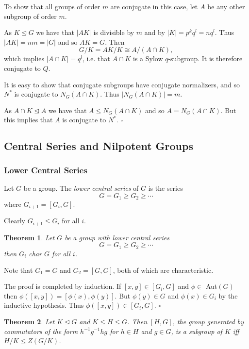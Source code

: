 \documentclass[10pt]{article}
\newtheorem{theorem}{Theorem}[section]
\newenvironment{proof}[1][Proof]{\begin{trivlist}
\item[\hskip \labelsep {\itshape #1}]}{\end{trivlist}}
\newenvironment{definition}[1][Definition]{\begin{trivlist}
\item[\hskip \labelsep {\bfseries #1}]}{\end{trivlist}}
\begin{document}
\begin{proof}
To show that all groups of order $m$ are conjugate in this case, let $A$ be any other subgroup of order $m$.

As $K \mathrel{\unlhd} G$ we have that $|AK|$ is divisible by $m$ and by $|K| = p^kq^l = nq^l$. Thus $|AK| = mn = |G|$ and so $AK = G$. Then
$$G/K = AK/K \cong A/(A\cap K),$$
which implies $|A\cap K| = q^l$, i.e. that $A\cap K$ is a Sylow $q$-subgroup. It is therefore conjugate to $Q$.

It is easy to show that conjugate subgroups have conjugate normalizers, and so $N^*$ is conjugate to $N_G(A\cap K)$. Thus $|N_G(A\cap K)| = m$.

As $A\cap K \mathrel{\unlhd} A$ we have that $A \leq N_G(A\cap K)$ and so $A = N_G(A\cap K)$. But this implies that $A$ is conjugate to $N^*$. $\square$
\end{proof}

\subsection{Central Series and Nilpotent Groups}

\subsubsection{Lower Central Series}

\begin{definition}
Let $G$ be a group. The \emph{lower central series} of $G$ is the series
$$G = G_1 \geq G_2 \geq \cdots$$
where $G_{i+1} = [G_i, G]$.
\end{definition}

Clearly $G_{i+1} \leq G_i$ for all $i$.

\begin{theorem}
Let $G$ be a group with lower central series
$$G = G_1 \geq G_2 \geq \cdots$$
then $G_i$ char $G$ for all $i$.
\end{theorem}

\begin{proof}
Note that $G_1 = G$ and $G_2 = [G, G]$, both of which are characteristic.

The proof is completed by induction. If $[x, y] \in [G_i, G]$ and $\phi \in$ Aut$(G)$ then $\phi([x, y]) = [\phi(x), \phi(y)]$. But $\phi(y) \in G$ and $\phi(x) \in G_i$ by the inductive hypothesis. Thus $\phi([x, y]) \in [G_i, G]$. $\square$
\end{proof}

\begin{theorem}
Let $K \mathrel{\unlhd} G$ and $K \leq H \leq G$. Then $[H, G]$, the group generated by commutators of the form $h^{-1}g^{-1}hg$ for $h \in H$ and $g \in G$, is a subgroup of $K$ iff $H/K \leq Z(G/K)$.
\end{theorem}
\end{document}

